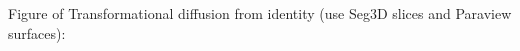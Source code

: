   
  Figure of Transformational diffusion from identity (use Seg3D slices and Paraview surfaces):
  \begin{figure}
    \centering

\end{figure}
